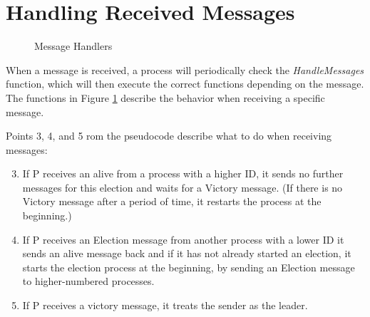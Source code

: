\documentclass{report}
\begin{document}
\section{Handling Received Messages}


\begin{figure}
\tlatex
\@x{}\moduleLeftDash{}\moduleRightDash\@xx{}%

%
\@xx{}%
%
%
\@xx{}%
\@pvspace{8.0pt}%
%
 \@x{\@s{126.95} \.{\land} State \.{'} \.{=} [ State {\EXCEPT} {\bang} [ p ] .
 Participating \.{=} {\FALSE} ,\,}%
\@x{\@s{244.46} {\bang} [ p ] . Leader \.{=} p ]}%
%
%
%
%
\@pvspace{8.0pt}%
%
\@xx{}%

\fl{}\bottombar\cl{}

\caption{Message Handlers}
\label{messagehandlers}
\end{figure}

When a message is received, a process will periodically check the \textit{HandleMessages} function, which will then execute the correct functions depending on the message. The functions in Figure \ref{messagehandlers} describe the behavior when receiving a specific message.

Points 3, 4, and 5 rom the pseudocode describe what to do when receiving messages:

\begin{enumerate}
  \setcounter{enumi}{2}
  \item If P receives an alive from a process with a higher ID, it sends no further messages for this election and waits for a Victory message. (If there is no Victory message after a period of time, it restarts the process at the beginning.)
  \item If P receives an Election message from another process with a lower ID it sends an alive message back and if it has not already started an election, it starts the election process at the beginning, by sending an Election message to higher-numbered processes.
  \item If P receives a victory message, it treats the sender as the leader.
\end{enumerate}
\end{document}
